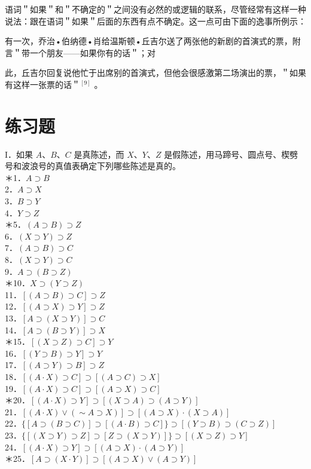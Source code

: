 语词＂如果＂和＂不确定的＂之间没有必然的或逻辑的联系，尽管经常有这样一种说法：跟在语词＂如果＂后面的东西有点不确定。这一点可由下面的逸事所例示：

有一次，乔治•伯纳德•肖给温斯顿•丘吉尔送了两张他的新剧的首演式的票，附言＂带一个朋友——如果你有的话＂；对

此，丘吉尔回复说他忙于出席别的首演式，但他会很感激第二场演出的票，＂如果有这样一张票的话＂${ }^{[9]}$ 。

\section*{练习题}
I．如果 $A 、 B 、 C$ 是真陈述，而 $X 、 Y 、 Z$ 是假陈述，用马蹄号、圆点号、楔劈号和波浪号的真值表确定下列哪些陈述是真的。\\
＊1．$A \supset B$\\
2．$A \supset X$\\
3．$B \supset Y$\\
4．$Y \supset Z$\\
＊5．$(A \supset B) \supset Z$\\
6．$(X \supset Y) \supset Z$\\
7．$(A \supset B) \supset C$\\
8．$(X \supset Y) \supset C$\\
9．$A \supset(B \supset Z)$\\
＊10．$X \supset(Y \supset Z)$\\
11．$[(A \supset B) \supset C] \supset Z$\\
12．$[(A \supset X) \supset Y] \supset Z$\\
13．$[A \supset(X \supset Y)] \supset C$\\
14．$[A \supset(B \supset Y)] \supset X$\\
＊15．$[(X \supset Z) \supset C] \supset Y$\\
16．$[(Y \supset B) \supset Y] \supset Y$\\
17．$[(A \supset Y) \supset B] \supset Z$\\
18．$[(A \cdot X) \supset C] \supset[(A \supset C) \supset X]$\\
19．$[(A \cdot X) \supset C] \supset[(A \supset X) \supset C]$\\
＊20．$[(A \cdot X) \supset Y] \supset[(X \supset A) \supset(A \supset Y)]$\\
21．$[(A \cdot X) \vee(\sim A \supset X)] \supset[(A \supset X) \cdot(X \supset A)]$\\
22．$\{[A \supset(B \supset C)] \supset[(A \cdot B) \supset C]\} \supset[(Y \supset B) \supset(C \supset Z)]$\\
23．$\{[(X \supset Y) \supset Z] \supset[Z \supset(X \supset Y)]\} \supset[(X \supset Z) \supset Y]$\\
24．$[(A \cdot X) \supset Y] \supset[(A \supset X) \cdot(A \supset Y)]$\\
＊25．$[A \supset(X \cdot Y)] \supset[(A \supset X) \vee(A \supset Y)]$

